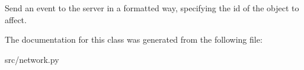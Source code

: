 \begin{DoxyVerb}
Send an event to the server in a formatted way, specifying the id
of the object to affect.
\end{DoxyVerb}
 

\-The documentation for this class was generated from the following file\-:\begin{DoxyCompactItemize}
\item 
src/network.\-py\end{DoxyCompactItemize}
